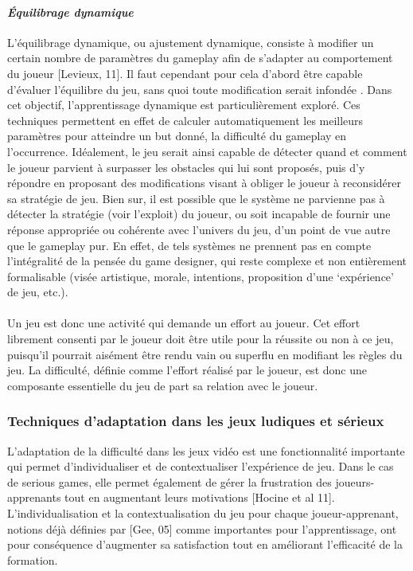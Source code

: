 		\paragraph{\emph{Équilibrage dynamique} \\ \quad}
L’équilibrage dynamique, ou ajustement dynamique, consiste à modifier un certain nombre de paramètres du gameplay afin de s’adapter au comportement du joueur [Levieux, 11]. Il faut cependant pour cela d’abord être capable d’évaluer l’équilibre du jeu, sans quoi toute modification serait infondée . Dans cet objectif, l’apprentissage dynamique est particulièrement exploré. Ces techniques permettent en effet de calculer automatiquement les meilleurs paramètres pour atteindre un but donné, la difficulté du gameplay en l'occurrence. Idéalement, le jeu serait ainsi capable de détecter quand et comment le joueur parvient à surpasser les obstacles qui lui sont proposés, puis d’y répondre en proposant des modifications visant à obliger le joueur à reconsidérer sa stratégie de jeu. Bien sur, il est possible que le système ne parvienne pas à détecter la stratégie (voir l’exploit) du joueur, ou soit incapable de fournir une réponse appropriée ou cohérente avec l’univers du jeu, d’un point de vue autre que le gameplay pur. En effet, de tels systèmes ne prennent pas en compte l’intégralité de la pensée du game designer, qui reste complexe et non entièrement formalisable (visée artistique, morale, intentions, proposition d’une ‘expérience’ de jeu, etc.).

\paragraph{}Un jeu est donc une activité qui demande un effort au joueur. Cet effort librement consenti par le joueur  doit être utile pour la réussite ou non à ce jeu, puisqu’il pourrait aisément être rendu vain ou superflu en modifiant les règles du jeu. La difficulté, définie comme l’effort réalisé par le joueur, est donc une composante essentielle du jeu de part sa relation avec le joueur.

		\subsubsection{Techniques d'adaptation dans les jeux ludiques et sérieux}
L'adaptation de la difficulté dans les jeux vidéo est une fonctionnalité importante qui permet d’individualiser et de contextualiser l'expérience de jeu. Dans le cas de serious games, elle permet également de gérer la frustration des joueurs-apprenants tout en augmentant leurs motivations [Hocine et al 11]. L'individualisation et la contextualisation du jeu pour chaque joueur-apprenant, notions déjà définies par [Gee, 05] comme importantes pour l'apprentissage, ont pour conséquence d'augmenter sa satisfaction tout en améliorant l’efficacité de la formation.
				
